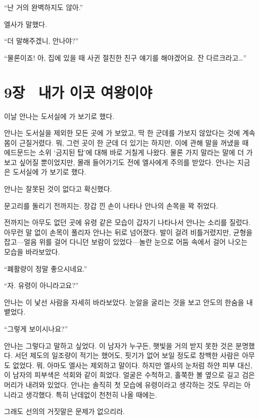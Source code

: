 ``난 거의 완벽하지도 않아.''

엘사가 말했다.

``더 말해주겠니, 안나야?''

``물론이죠! 아, 집에 있을 때 사귄 절친한 친구 얘기를 해야겠어요. 잔 다르크라고\ldots''



\chapter[9장  내가 이곳 여왕이야][9장\hspace*{.5em}내가 이곳 여왕이야]{9장 \ 내가 이곳 여왕이야}



이날 안나는 도서실에 가 보기로 했다.

안나는 도서실을 제외한 모든 곳에 가 보았고, 딱 한 군데를 가보지 않았다는 것에 계속 몸이 근질거렸다. 뭐, 그런 곳이 한 군데 더 있기는 하지만, 이에 관해 말을 꺼냈을 때 에드문드는 소위 `금지된 탑'에 대해 바로 거칠게 나왔다. 물론 가지 말라는 말에 더 가보고 싶어질 뿐이었지만, 몰래 들어가기도 전에 엘사에게 주의를 받았다. 안나는 지금은 도서실에 가 보기로 했다.

안나는 잘못된 것이 없다고 확신했다.

문고리를 돌리기 전까지는. 장갑 낀 손이 나타나 안나의 손목을 꽉 쥐었다.

전까지는 아무도 없던 곳에 유령 같은 모습이 갑자기 나타나서 안나는 소리를 질렀다. 아무런 말 없이 손목이 풀리자 안나는 뒤로 넘어졌다. 발이 걸려 비틀거렸지만, 균형을 잡고—얼음 위를 걸어 다니던 보람이 있었다—놀란 눈으로 어둠 속에서 걸어 나오는 모습을 바라보았다.

``폐활량이 정말 좋으시네요.''

``자. 유령이 아니라고요?''

안나는 이 낯선 사람을 자세히 바라보았다. 눈알을 굴리는 것을 보고 안도의 한숨을 내뱉었다.

``그렇게 보이시나요?''

안나는 그렇다고 말하고 싶었다. 이 남자가 누구든, 햇빛을 거의 받지 못한 것은 분명했다. 서던 제도의 일조량이 적기는 했어도, 핏기가 없어 보일 정도로 창백한 사람은 아무도 없었다. 뭐, 아마도 엘사는 제외하고 말이다. 하지만 엘사의 눈처럼 하얀 피부 대신, 이 남자의 피부색은 석회와 같이 희었다. 얼굴은 수척하고, 홀쭉한 볼 옆으로 길고 검은 머리가 내려와 있었다. 안나는 솔직히 첫 모습에 유령이라고 생각하는 것도 무리는 아니라고 생각했다. 특히 난데없이 천천히 나올 때에는.

그래도 선의의 거짓말은 문제가 없으리라.


